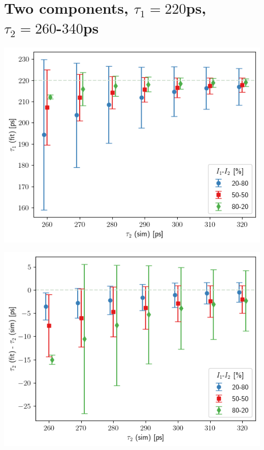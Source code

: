 \section{\boldmath Two components, $\tau_1 = 220$ps, $\tau_2=260$-$340$ps \unboldmath \label{t1-220}}
\vfill

\begin{minipage}{.5\linewidth}
    \centering
    \includegraphics[width=\linewidth]{Batch 3/regular IRF/tau1 220/output/plotfin/t1.png}
    \label{fig:220-t1}
\end{minipage}
\begin{minipage}{.5\linewidth}
    \centering
    \includegraphics[width=\linewidth]{Batch 3/regular IRF/tau1 220/output/plotfin/t2.png}
    \label{fig:220-t2}
\end{minipage}

